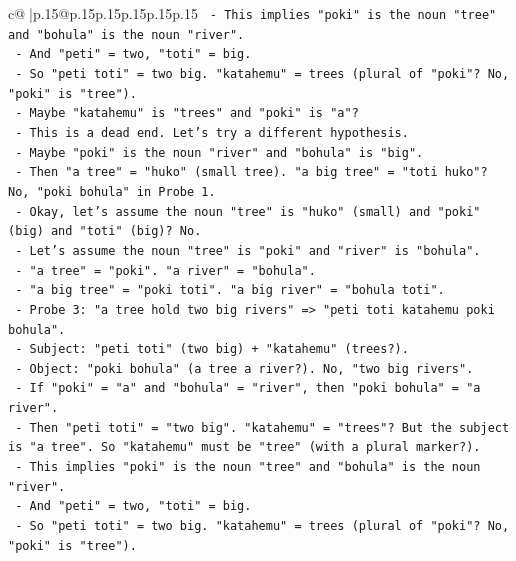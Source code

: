 \documentclass{article}
\begin{document}
{\begin{supertabular}{c@{$\;$}|p{.15\linewidth}@{}p{.15\linewidth}p{.15\linewidth}p{.15\linewidth}p{.15\linewidth}p{.15\linewidth}}
{{{\texttt{                    {-} This implies "poki" is the noun "tree" and "bohula" is the noun "river".} \\
\texttt{                    {-} And "peti" = two, "toti" = big.} \\
\texttt{                    {-} So "peti toti" = two big. "katahemu" = trees (plural of "poki"? No, "poki" is "tree").} \\
\texttt{                    {-} Maybe "katahemu" is "trees" and "poki" is "a"?} \\
\texttt{                    {-} This is a dead end. Let's try a different hypothesis.} \\
\texttt{                    {-} Maybe "poki" is the noun "river" and "bohula" is "big".} \\
\texttt{                    {-} Then "a tree" = "huko" (small tree). "a big tree" = "toti huko"? No, "poki bohula" in Probe 1.} \\
\texttt{                    {-} Okay, let's assume the noun "tree" is "huko" (small) and "poki" (big) and "toti" (big)? No.} \\
\texttt{                    {-} Let's assume the noun "tree" is "poki" and "river" is "bohula".} \\
\texttt{                    {-} "a tree" = "poki". "a river" = "bohula".} \\
\texttt{                    {-} "a big tree" = "poki toti". "a big river" = "bohula toti".} \\
\texttt{                    {-} Probe 3: "a tree hold two big rivers" => "peti toti katahemu poki bohula".} \\
\texttt{                      {-} Subject: "peti toti" (two big) + "katahemu" (trees?).} \\
\texttt{                      {-} Object: "poki bohula" (a tree a river?). No, "two big rivers".} \\
\texttt{                      {-} If "poki" = "a" and "bohula" = "river", then "poki bohula" = "a river".} \\
\texttt{                      {-} Then "peti toti" = "two big". "katahemu" = "trees"? But the subject is "a tree". So "katahemu" must be "tree" (with a plural marker?).} \\
\texttt{                      {-} This implies "poki" is the noun "tree" and "bohula" is the noun "river".} \\
\texttt{                      {-} And "peti" = two, "toti" = big.} \\
\texttt{                      {-} So "peti toti" = two big. "katahemu" = trees (plural of "poki"? No, "poki" is "tree").} \\
}}}
\end{supertabular}}
\end{document}
